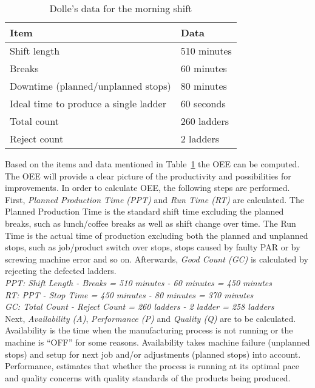 \documentclass[runningheads]{llncs}
\begin{document}
\begin{table}[]
\label{tab:distance}
\centering
\caption{Dolle's data for the morning shift}
\begin{tabular}{p{5.5cm}|p{5.0cm}}
\hline
\multicolumn{1}{l}{\textbf{Item}} &  \textbf{Data} \\ \hline
Shift length            & 510 minutes\\
Breaks           &  60 minutes\\
Downtime (planned/unplanned stops)            &   80 minutes\\
Ideal time to produce a single ladder   &   60 seconds\\
Total count  & 260 ladders\\
Reject count & 2 ladders\\
\hline
\end{tabular}
\label{tab:data}
\end{table}

Based on the items and data mentioned in Table~\ref{tab:data} the OEE can be computed. The OEE will provide a clear picture of the productivity and possibilities for improvements. In order to calculate OEE, the following steps are performed. First, \emph{Planned Production Time (PPT)} and \emph{Run Time (RT)} are calculated. The Planned Production Time is the standard shift time excluding the planned breaks, such as lunch/coffee breaks as well as shift change over time. The Run Time is the actual time of production excluding both the planned and unplanned stops, such as job/product switch over stops, stops caused by faulty PAR or by screwing machine error and so on. Afterwards, \emph{Good Count (GC)} is calculated by rejecting the defected ladders.\\


\emph{PPT: Shift Length - Breaks = 510 minutes - 60 minutes = 450 minutes}\\

\emph{RT: PPT - Stop Time = 450 minutes - 80 minutes = 370 minutes}\\

\emph{GC: Total Count - Reject Count = 260 ladders - 2 ladder = 258 ladders} \\


Next, \emph{Availability (A)}, \emph{Performance (P)} and \emph{Quality (Q)} are to be calculated. Availability is the time when the manufacturing process is not running or the machine is ``OFF'' for some reasons. Availability takes machine failure (unplanned stops) and setup for next job and/or adjustments (planned stops) into account. Performance, estimates that whether the process is running at its optimal pace and quality concerns with quality standards of the products being produced.\\
\end{document}
